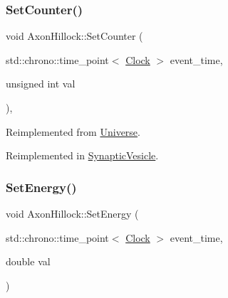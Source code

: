\mbox{\label{classAxonHillock_a0220cee0ad99ddc48496982078c1856c}} 
\subsubsection{\texorpdfstring{Set\+Counter()}{SetCounter()}}
{\footnotesize\ttfamily void Axon\+Hillock\+::\+Set\+Counter (\begin{DoxyParamCaption}\item[{std\+::chrono\+::time\+\_\+point$<$ \mbox{\hyperlink{universe_8h_a0ef8d951d1ca5ab3cfaf7ab4c7a6fd80}{Clock}} $>$}]{event\+\_\+time,  }\item[{unsigned int}]{val }\end{DoxyParamCaption})\hspace{0.3cm}{\ttfamily [inline]}, {\ttfamily [virtual]}}



Reimplemented from \mbox{\hyperlink{classUniverse_aa22202ae740eb1355529afcb13285e91}{Universe}}.



Reimplemented in \mbox{\hyperlink{classSynapticVesicle_a7fd7cfce5eccb904206d968866f85220}{Synaptic\+Vesicle}}.

\mbox{\label{classAxonHillock_a830afd18810e0eaa11a9e7a500b8f0c4}} 
\subsubsection{\texorpdfstring{Set\+Energy()}{SetEnergy()}}
{\footnotesize\ttfamily void Axon\+Hillock\+::\+Set\+Energy (\begin{DoxyParamCaption}\item[{std\+::chrono\+::time\+\_\+point$<$ \mbox{\hyperlink{universe_8h_a0ef8d951d1ca5ab3cfaf7ab4c7a6fd80}{Clock}} $>$}]{event\+\_\+time,  }\item[{double}]{val }\end{DoxyParamCaption})\hspace{0.3cm}{\ttfamily [inline]}}

\mbox{\label{classAxonHillock_a5a6a6a93a98b32c303b9ee6320c09909}} 
